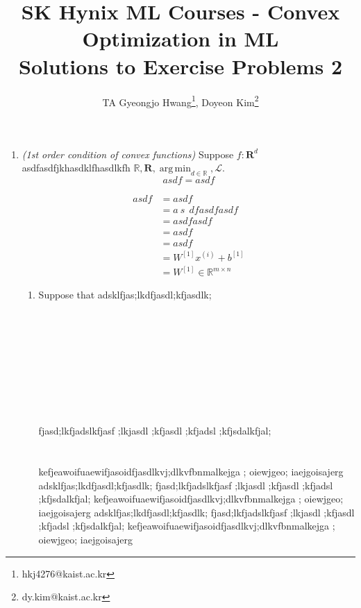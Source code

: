 \documentclass{article}
\title{SK Hynix ML Courses - Convex Optimization in ML\\ \vspace{0.2in} Solutions to Exercise Problems 2}
\author{TA Gyeongjo Hwang\footnote{hkj4276@kaist.ac.kr}, Doyeon Kim\footnote{dy.kim@kaist.ac.kr}}
\DeclareMathOperator*{\argmin}{arg\,min}
\begin{document}
\maketitle

\begin{enumerate}
\item \textit{(1st order condition of convex functions)} Suppose $f: \mathbf{R}^d$
asdfasdfjkhasdklfhasdlkfh $\mathbb{R}, \mathbf{R}, \argmin_{d \in \mathbb{R}}, \mathcal{L}$.
\begin{equation}
asdf = asdf
\end{equation}

\begin{align}
asdf &= asdf \\
&= a~s~~dfasdfasdf \\
&= asdfasdf \\
&= asdf \\
&= asdf \\
&= W^{[1]}x^{(i)} + b^{[1]} \\
&= W^{[1]} \in \mathbb{R}^{m \times n}
\end{align}


\begin{enumerate}
\item Suppose that adsklfjas;lkdfjasdl;kfjasdlk;\\\\\\\\\\\\\\\\\\\\ fjasd;lkfjadslkfjasf ;lkjasdl ;kfjasdl ;kfjadsl ;kfjsdalkfjal;\\\\\\ kefjeawoifuaewifjasoidfjasdlkvj;dlkvfbnmalkejga ; oiewjgeo; iaejgoisajerg adsklfjas;lkdfjasdl;kfjasdlk; fjasd;lkfjadslkfjasf ;lkjasdl ;kfjasdl ;kfjadsl ;kfjsdalkfjal; kefjeawoifuaewifjasoidfjasdlkvj;dlkvfbnmalkejga ; oiewjgeo; iaejgoisajerg adsklfjas;lkdfjasdl;kfjasdlk; fjasd;lkfjadslkfjasf ;lkjasdl ;kfjasdl ;kfjadsl ;kfjsdalkfjal; kefjeawoifuaewifjasoidfjasdlkvj;dlkvfbnmalkejga ; oiewjgeo; iaejgoisajerg

\end{enumerate}
\end{enumerate}
\end{document}

